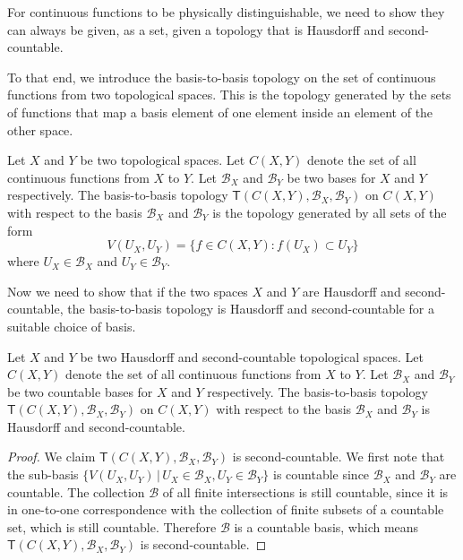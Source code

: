 \documentclass[11pt,letterpaper,fleqn]{memoir} %
\begin{document}
\begin{mathSection}

For continuous functions to be physically distinguishable, we need to show they can always be given, as a set, given a topology that is Hausdorff and second-countable.

To that end, we introduce the basis-to-basis topology on the set of continuous functions from two topological spaces. This is the topology generated by the sets of functions that map a basis element of one element inside an element of the other space. 

\begin{defn} Let $X$ and $Y$ be two topological spaces. Let $C(X,Y)$ denote the set of all continuous functions from $X$ to $Y$. Let $\mathcal{B}_X$ and $\mathcal{B}_Y$ be two bases for $X$ and $Y$ respectively. The basis-to-basis topology $\mathsf{T}(C(X,Y), \mathcal{B}_X, \mathcal{B}_Y)$ on $C(X,Y)$ with respect to the basis $\mathcal{B}_X$ and $\mathcal{B}_Y$ is the topology generated by all sets of the form 
	$$
	V(U_X, U_Y) = \{f\in C(X,Y) : f(U_X)\subset U_Y\}
	$$
where $U_X \in \mathcal{B}_X$ and $U_Y \in \mathcal{B}_Y$.
\end{defn}

Now we need to show that if the two spaces $X$ and $Y$ are Hausdorff and second-countable, the basis-to-basis topology is Hausdorff and second-countable for a suitable choice of basis.

\begin{prop}
	Let $X$ and $Y$ be two Hausdorff and second-countable topological spaces. Let $C(X,Y)$ denote the set of all continuous functions from $X$ to $Y$. Let $\mathcal{B}_X$ and $\mathcal{B}_Y$ be two countable bases for $X$ and $Y$ respectively. The basis-to-basis topology $\mathsf{T}(C(X,Y), \mathcal{B}_X, \mathcal{B}_Y)$ on $C(X,Y)$ with respect to the basis $\mathcal{B}_X$ and $\mathcal{B}_Y$ is Hausdorff and second-countable. 
\end{prop}
\begin{proof}
	We claim $\mathsf{T}(C(X,Y), \mathcal{B}_X, \mathcal{B}_Y)$ is second-countable. We first note that the sub-basis $\{V(U_X, U_Y) \, |\,   U_X \in \mathcal{B}_X , U_Y \in \mathcal{B}_Y \}$ is countable since $\mathcal{B}_X$ and $\mathcal{B}_Y$ are countable. The collection $\mathcal{B}$ of all finite intersections is still countable, since it is in one-to-one correspondence with the collection of finite subsets of a countable set, which is still countable. Therefore $\mathcal{B}$ is a countable basis, which means $\mathsf{T}(C(X,Y), \mathcal{B}_X, \mathcal{B}_Y)$ is second-countable.
	

\end{proof}
\end{mathSection}
\end{document}
